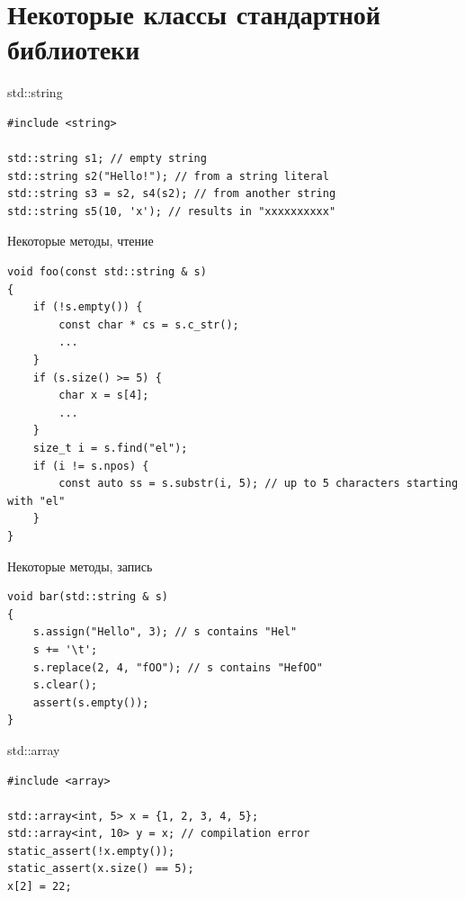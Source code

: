 \documentclass[unknownkeysallowed,xcolor=table]{beamer}
\begin{document}

\section{Некоторые классы стандартной библиотеки}

\begin{frame}[fragile]{std::string}

\begin{lstlisting}
#include <string>

std::string s1; // empty string
std::string s2("Hello!"); // from a string literal
std::string s3 = s2, s4(s2); // from another string
std::string s5(10, 'x'); // results in "xxxxxxxxxx"
\end{lstlisting}

\end{frame}

\begin{frame}[fragile]{Некоторые методы, чтение}

\begin{lstlisting}
void foo(const std::string & s)
{
    if (!s.empty()) {
        const char * cs = s.c_str();
        ...
    }
    if (s.size() >= 5) {
        char x = s[4];
        ...
    }
    size_t i = s.find("el");
    if (i != s.npos) {
        const auto ss = s.substr(i, 5); // up to 5 characters starting with "el"
    }
}
\end{lstlisting}

\end{frame}

\begin{frame}[fragile]{Некоторые методы, запись}

\begin{lstlisting}
void bar(std::string & s)
{
    s.assign("Hello", 3); // s contains "Hel"
    s += '\t';
    s.replace(2, 4, "fOO"); // s contains "HefOO"
    s.clear();
    assert(s.empty());
}
\end{lstlisting}

\end{frame}

\begin{frame}[fragile]{std::array}

\begin{lstlisting}
#include <array>

std::array<int, 5> x = {1, 2, 3, 4, 5};
std::array<int, 10> y = x; // compilation error
static_assert(!x.empty());
static_assert(x.size() == 5);
x[2] = 22;
\end{lstlisting}

\end{frame}
\end{document}

